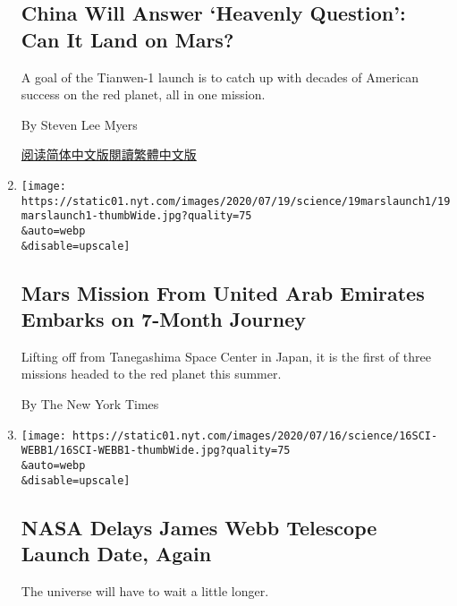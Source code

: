 \begin{enumerate}
  \hypertarget{china-will-answer-heavenly-question-can-it-land-on-mars}{%
  \subsection{China Will Answer `Heavenly Question': Can It Land on
  Mars?}\label{china-will-answer-heavenly-question-can-it-land-on-mars}}

  A goal of the Tianwen-1 launch is to catch up with decades of American
  success on the red planet, all in one mission.

  By Steven Lee Myers

  \href{https://cn.nytimes.com/science/20200723/china-mars-mission/}{阅读简体中文版}\href{https://cn.nytimes.com/science/20200723/china-mars-mission/zh-hant/}{閱讀繁體中文版}
\item
  \href{/2020/07/19/science/emirates-mars-mission.html}{}

  \texttt{[image: https://static01.nyt.com/images/2020/07/19/science/19marslaunch1/19marslaunch1-thumbWide.jpg?quality=75\\\&auto=webp\\\&disable=upscale]}

  \hypertarget{mars-mission-from-united-arab-emirates-embarks-on-7-month-journey}{%
  \subsection{Mars Mission From United Arab Emirates Embarks on 7-Month
  Journey}\label{mars-mission-from-united-arab-emirates-embarks-on-7-month-journey}}

  Lifting off from Tanegashima Space Center in Japan, it is the first of
  three missions headed to the red planet this summer.

  By The New York Times
\item
  \href{/2020/07/16/science/nasa-james-webb-space-telescope-delay.html}{}

  \texttt{[image: https://static01.nyt.com/images/2020/07/16/science/16SCI-WEBB1/16SCI-WEBB1-thumbWide.jpg?quality=75\\\&auto=webp\\\&disable=upscale]}

  \hypertarget{nasa-delays-james-webb-telescope-launch-date-again}{%
  \subsection{NASA Delays James Webb Telescope Launch Date,
  Again}\label{nasa-delays-james-webb-telescope-launch-date-again}}

  The universe will have to wait a little longer.


\end{enumerate}
